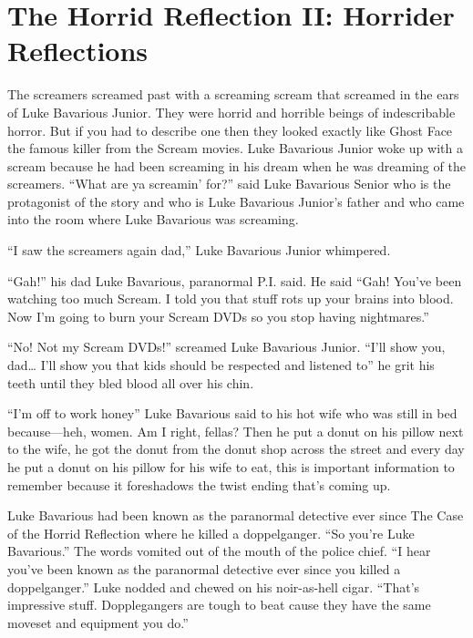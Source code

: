 

\chapter{The Horrid Reflection II: Horrider Reflections}



The screamers screamed past with a screaming scream that screamed
in the ears of Luke Bavarious Junior. They were horrid and horrible
beings of indescribable horror. But if you had to describe one then
they looked exactly like Ghost Face the famous killer from the
Scream movies. Luke Bavarious Junior woke up with a scream because
he had been screaming in his dream when he was dreaming of the
screamers. ``What are ya screamin' for?'' said Luke
Bavarious Senior who is the protagonist of the story and who is
Luke Bavarious Junior's father and who came into the room
where Luke Bavarious was screaming.

``I saw the screamers again dad,'' Luke Bavarious Junior
whimpered.

``Gah!'' his dad Luke Bavarious, paranormal P.I. said. He
said ``Gah! You've been watching too much Scream. I told
you that stuff rots up your brains into blood. Now I'm going
to burn your Scream DVDs so you stop having
nightmares.''

``No! Not my Scream DVDs!'' screamed Luke Bavarious
Junior. ``I'll show you, dad{\ldots} I'll show you
that kids should be respected and listened to'' he grit his
teeth until they bled blood all over his chin.



``I'm off to work honey'' Luke Bavarious said to
his hot wife who was still in bed because---heh, women. Am I
right, fellas? Then he put a donut on his pillow next to the wife,
he got the donut from the donut shop across the street and every
day he put a donut on his pillow for his wife to eat, this is
important information to remember because it foreshadows the twist
ending that's coming up.



Luke Bavarious had been known as the paranormal detective ever
since The Case of the Horrid Reflection where he killed a
doppelganger. ``So you're Luke Bavarious.'' The
words vomited out of the mouth of the police chief. ``I hear
you've been known as the paranormal detective ever since you
killed a doppelganger.'' Luke nodded and chewed on his
noir-as-hell cigar. ``That's impressive stuff.
Dopplegangers are tough to beat cause they have the same moveset
and equipment you do.''

